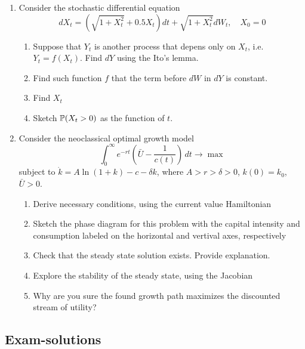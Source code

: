 \documentclass[pdftex,12pt,a4paper]{article}
\begin{document}
\begin{enumerate}[resume]
\item Consider the stochastic differential equation 
\begin{equation}
dX_t=(\sqrt{1+X_t^2}+0.5X_t)dt+\sqrt{1+X_t^2}dW_t,\quad X_0=0 \nonumber
\end{equation}
\begin{enumerate}
\item Suppose that $Y_t$ is another process that depens only on $X_t$, i.e. $Y_t=f(X_t)$. Find $dY$ using the Ito's lemma.
\item Find such function $f$ that the term before $dW$ in $dY$ is constant.
\item Find $X_t$
\item Sketch $\P(X_t>0)$ as the function of $t$.
\end{enumerate}

\item Consider the neoclassical optimal growth model
\begin{equation}
\int_0^{\infty}e^{-rt}\left( \bar{U}-\frac{1}{c(t)}\right)\,dt \to \max \nonumber
\end{equation}
subject to $\dot{k}=A\ln(1+k)-c-\delta k$, where $A>r>\delta>0$, $k(0)=k_0$, $\bar{U}>0$.
\begin{enumerate}
\item Derive necessary conditions, using the current value Hamiltonian
\item Sketch the phase diagram for this problem with the capital intensity and consumption labeled on the horizontal and vertival axes, respectively
\item Check that the steady state solution exists. Provide explanation.
\item Explore the stability of the steady state, using the Jacobian
\item Why are you sure the found growth path maximizes the discounted stream of utility?
\end{enumerate}
\end{enumerate}

\subsection{Exam-solutions}
\end{document}
